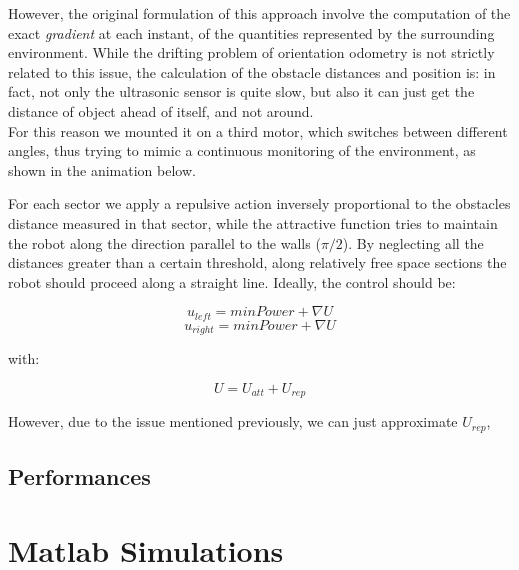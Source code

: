\documentclass[a4paper,11pt,oneside]{book}
\begin{document}
			However, the original formulation of this approach involve the computation of the exact \emph{gradient} at each instant, of the quantities represented by the surrounding environment. While the drifting problem of orientation odometry is not strictly related to this issue, the calculation of the obstacle distances and position is: in fact, not only the ultrasonic sensor is quite slow, but also it can just get the distance of object ahead of itself, and not around.\\
			For this reason we mounted it on a third motor, which switches between different angles, thus trying to mimic a continuous monitoring of the environment, as shown in the animation below.
			
		
			\begin{center}	
			\end{center}
		
			
			For each sector we apply a repulsive action inversely proportional to the obstacles distance measured in that sector, while the attractive function tries to maintain the robot along the direction parallel to the walls ($\pi/2$). By neglecting all the distances greater than a certain threshold, along relatively free space sections the robot should proceed along a straight line. Ideally, the control should be:
			
				$$u_{left} = minPower + \nabla U$$
			    $$u_{right}= minPower + \nabla U$$
			    
			with:
			
				$$U = U_{att} + U_{rep} $$
				
			However, due to the issue mentioned previously, we can just approximate $U_{rep}$,
				
				
				
				
				
				
			
			\section{Performances}
			
			
			
			
			
			
			\chapter{Matlab Simulations}
			
\end{document}
